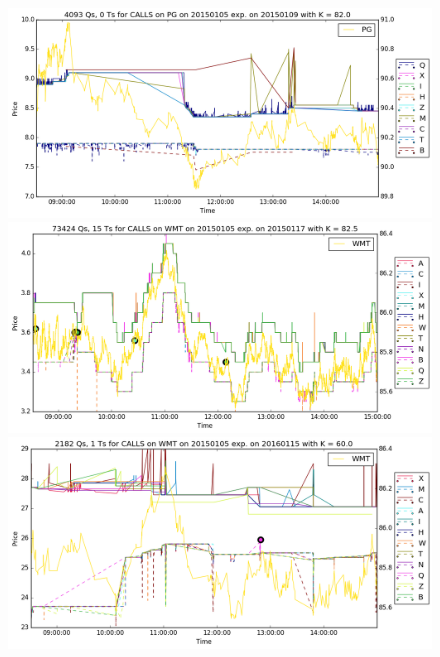 \documentclass[a4paper,12pt]{article}
\theoremstyle{plain}
\theoremstyle{definition}
\begin{document}
\begin{figure}[H]
\begin{center}
 \hspace{3mm}
 \includegraphics[width=\linewidth]{figures/contract_pics/PG_middle.png}
 \endminipage\\
  \vspace{5mm}
 \includegraphics[width=\linewidth]{figures/contract_pics/WMT_top.png}
 \endminipage
 \hspace{3mm}
 \includegraphics[width=\linewidth]{figures/contract_pics/WMT_middle.png}
 \endminipage\\
  \vspace{5mm}

\end{center}
\end{figure}
\end{document}
